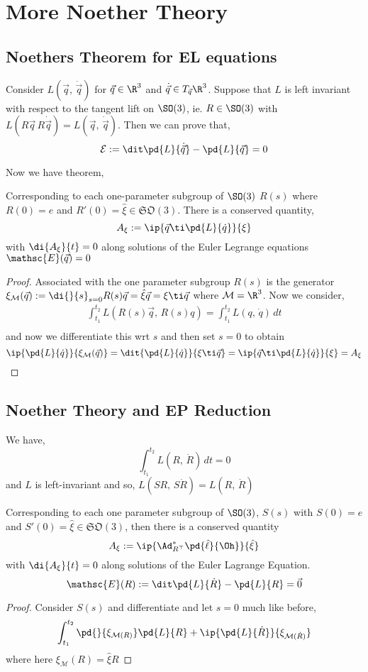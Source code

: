 
\section{More Noether Theory}

\subsection{Noethers Theorem for EL equations}

Consider $L(\vec q,\, \dot{\vec q})$ for $\vec q \in \R^3$ and $\dot{\vec q} \in T_{\vec q}\R^3$. Suppose that $L$ is left invariant with respect to the tangent lift on $\SO(3)$, ie. $R\in\SO(3)$ with $L(R\vec q\, R\dot{\vec q}) = L(\vec q,\,\dot{\vec q})$. Then we can prove that,
$$ \mathcal{E} := \dit \pd{L}{\dot{\vec q}} - \pd{L}{\vec q} = 0 $$

Now we have theorem,
\begin{nthm}
  Corresponding to each one-parameter subgroup of $\SO(3)$ $R(s)$ where $R(0) = e$ and $R'(0) = \hat\xi \in \mathfrak{SO}(3)$. There is a conserved quantity,
  $$ A_\xi := \ip{\vec q \ti \pd{L}{\dot q}}{\xi} $$
  with $\di{A_\xi}{t} = 0$ along solutions of the Euler Legrange equations $\mathsc{E}(\vec q) = 0$
\end{nthm}
\begin{proof}
  Associated with the one parameter subgroup $R(s)$ is the generator $\xi_{\mathcal{M}}(\vec q) := \di{}{s}_{s=0} R(s)\vec q = \hat\xi \vec q = \xi\ti\vec q$ where $\mathcal{M} = \R^3$. Now we consider,
  \begin{align*}
    \int_{t_1}^{t_2} L(R(s)\vec q,\,R(s)q) = \int_{t_1}^{t_2} L(q,\,\dot q) \,dt \\
  \end{align*}
  and now we differentiate this wrt $s$ and then set $s = 0$ to obtain
  $$ \ip{\pd{L}{\dot q}}{\xi_{\mathcal{M}}(\vec q)} = \dit{\pd{L}{\dot q}}{\xi \ti \vec q} = \ip{\vec q \ti \pd{L}{\dot q}}{\xi} = A_\xi$$
\end{proof}

\subsection{Noether Theory and EP Reduction}
We have,
$$ \int_{t_1}^{t_2} L(R,\,\dot R)\,dt = 0 $$
and $L$ is left-invariant and so, $L(SR,\,S\dot R) = L(R,\,\dot R)$
\begin{nthm}
  Corresponding to each one parameter subgroup of $\SO(3)$, $S(s)$ with $S(0)= e$ and $S'(0) = \hat\xi \in \mathfrak{SO}(3)$, then there is a conserved quantity
  $$ A_\xi := \ip{\Ad^*_{R^\top}\pd{\hat\ell}{\Oh}}{\hat\xi} $$
  with $\di{A_\xi}{t} = 0$ along solutions of the Euler Lagrange Equation.
  $$ \mathsc{E}(R) := \dit\pd{L}{\dot R} - \pd{L}{R} = \vec 0 $$
\end{nthm}
\begin{proof}
  Consider $S(s)$ and differentiate and let $s = 0$ much like before,
  $$ \int_{t_1}^{t_2} \pd{}{\xi_{\mathcal{M}(R)}}\pd{L}{R} + \ip{\pd{L}{\dot R}}{\xi_{\mathcal{M}(\dot R)}} $$
  where here $\xi_{\mathcal{M}}(R) = \hat\xi R$
\end{proof}
